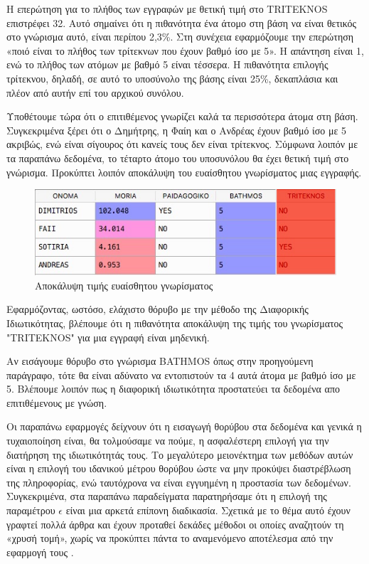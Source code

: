 H επερώτηση για το πλήθος των εγγραφών με θετική τιμή στο \textlatin{TRITEKNOS} επιστρέφει 32. Αυτό σημαίνει ότι η πιθανότητα ένα άτομο στη βάση να είναι θετικός στο γνώρισμα αυτό, είναι περίπου 2,3\%. Στη συνέχεια εφαρμόζουμε την επερώτηση «ποιό είναι το πλήθος των τρίτεκνων που έχουν βαθμό ίσο με 5». Η απάντηση είναι 1, ενώ το πλήθος των ατόμων με βαθμό 5 είναι τέσσερα. Η πιθανότητα επιλογής τρίτεκνου, δηλαδή, σε αυτό το υποσύνολο της βάσης είναι 25\%, δεκαπλάσια και πλέον από αυτήν επί του αρχικού συνόλου.

Υποθέτουμε τώρα ότι ο επιτιθέμενος γνωρίζει καλά τα περισσότερα άτομα στη βάση. Συγκεκριμένα ξέρει ότι ο Δημήτρης, η Φαίη και ο Ανδρέας έχουν βαθμό ίσο με 5 ακριβώς, ενώ είναι σίγουρος ότι κανείς τους δεν είναι τρίτεκνος. Σύμφωνα λοιπόν με τα παραπάνω δεδομένα, το τέταρτο άτομο του υποσυνόλου θα έχει θετική τιμή στο γνώρισμα. Προκύπτει λοιπόν αποκάλυψη του ευαίσθητου γνωρίσματος μιας εγγραφής.


\begin{figure} [h!]
\begin{center}
  \includegraphics[scale=0.6]{images/tri1.jpg}
  \caption{Αποκάλυψη τιμής ευαίσθητου γνωρίσματος}
  \end{center}
\end{figure}


Εφαρμόζοντας, ωστόσο, ελάχιστο θόρυβο με την μέθοδο της Διαφορικής Ιδιωτικότητας, βλέπουμε ότι η πιθανότητα αποκάλυψη της τιμής του γνωρίσματος "\textlatin{TRITEKNOS}" για μια εγγραφή είναι μηδενική.

Αν εισάγουμε θόρυβο στο γνώρισμα \textlatin{BATHMOS} όπως στην προηγούμενη παράγραφο, τότε θα είναι αδύνατο να εντοπιστούν τα 4 αυτά άτομα με βαθμό ίσο με 5. Βλέπουμε λοιπόν πως η διαφορική ιδιωτικότητα προστατεύει τα δεδομένα απο επιτιθέμενους με γνώση. 

Οι παραπάνω εφαρμογές δείχνουν ότι η εισαγωγή θορύβου στα δεδομένα και γενικά η τυχαιοποίηση είναι, θα τολμούσαμε να πούμε, η ασφαλέστερη επιλογή για την διατήρηση της ιδιωτικότητάς τους. Το μεγαλύτερο μειονέκτημα των μεθόδων αυτών είναι η επιλογή του ιδανικού μέτρου θορύβου ώστε να μην προκύψει διαστρέβλωση της πληροφορίας, ενώ ταυτόχρονα να είναι εγγυημένη η προστασία των δεδομένων. Συγκεκριμένα, στα παραπάνω παραδείγματα παρατηρήσαμε ότι η επιλογή της παραμέτρου $\epsilon$ είναι μια αρκετά επίπονη διαδικασία. Σχετικά με το θέμα αυτό έχουν γραφτεί πολλά άρθρα και έχουν προταθεί δεκάδες μέθοδοι οι οποίες αναζητούν τη «χρυσή τομή», χωρίς να προκύπτει πάντα το αναμενόμενο αποτέλεσμα από την εφαρμογή τους \textlatin{\cite{murtagh2016complexity}}. 